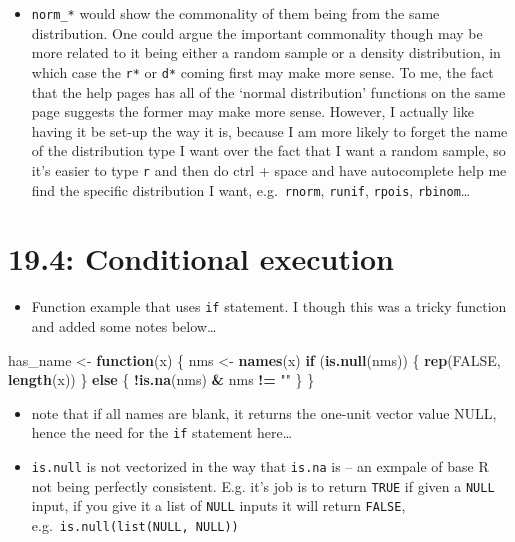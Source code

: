 \documentclass[]{book}
\newenvironment{Shaded}{\begin{snugshade}}{\end{snugshade}}
\newcommand{\ControlFlowTok}[1]{\textcolor[rgb]{0.13,0.29,0.53}{\textbf{#1}}}
\newcommand{\KeywordTok}[1]{\textcolor[rgb]{0.13,0.29,0.53}{\textbf{#1}}}
\newcommand{\NormalTok}[1]{#1}
\newcommand{\OperatorTok}[1]{\textcolor[rgb]{0.81,0.36,0.00}{\textbf{#1}}}
\newcommand{\OtherTok}[1]{\textcolor[rgb]{0.56,0.35,0.01}{#1}}
\newcommand{\StringTok}[1]{\textcolor[rgb]{0.31,0.60,0.02}{#1}}
\providecommand{\tightlist}{%
  \setlength{\itemsep}{0pt}\setlength{\parskip}{0pt}}
\theoremstyle{definition}
\theoremstyle{definition}
\theoremstyle{definition}
\theoremstyle{remark}
\begin{document}
\begin{enumerate}
  \begin{itemize}
  \tightlist
  \item
    \texttt{norm\_*} would show the commonality of them being from the
    same distribution. One could argue the important commonality though
    may be more related to it being either a random sample or a density
    distribution, in which case the \texttt{r*} or \texttt{d*} coming
    first may make more sense. To me, the fact that the help pages has
    all of the `normal distribution' functions on the same page suggests
    the former may make more sense. However, I actually like having it
    be set-up the way it is, because I am more likely to forget the name
    of the distribution type I want over the fact that I want a random
    sample, so it's easier to type \texttt{r} and then do ctrl + space
    and have autocomplete help me find the specific distribution I want,
    e.g.~\texttt{rnorm}, \texttt{runif}, \texttt{rpois},
    \texttt{rbinom}\ldots{}
  \end{itemize}
\end{enumerate}

\hypertarget{conditional-execution}{%
\section{19.4: Conditional execution}\label{conditional-execution}}

\begin{itemize}
\tightlist
\item
  Function example that uses \texttt{if} statement. I though this was a
  tricky function and added some notes below\ldots{}
\end{itemize}

\begin{Shaded}
\begin{Highlighting}[]
\NormalTok{has_name <-}\StringTok{ }\ControlFlowTok{function}\NormalTok{(x) \{}
\NormalTok{  nms <-}\StringTok{ }\KeywordTok{names}\NormalTok{(x) }
  \ControlFlowTok{if}\NormalTok{ (}\KeywordTok{is.null}\NormalTok{(nms)) \{ }
    \KeywordTok{rep}\NormalTok{(}\OtherTok{FALSE}\NormalTok{, }\KeywordTok{length}\NormalTok{(x))}
\NormalTok{  \} }\ControlFlowTok{else}\NormalTok{ \{}
    \OperatorTok{!}\KeywordTok{is.na}\NormalTok{(nms) }\OperatorTok{&}\StringTok{ }\NormalTok{nms }\OperatorTok{!=}\StringTok{ ""}
\NormalTok{  \}}
\NormalTok{\}}
\end{Highlighting}
\end{Shaded}

\begin{itemize}
\tightlist
\item
  note that if all names are blank, it returns the one-unit vector value
  NULL, hence the need for the \texttt{if} statement here\ldots{}
\item
  \texttt{is.null} is not vectorized in the way that \texttt{is.na} is
  -- an exmpale of base R not being perfectly consistent. E.g. it's job
  is to return \texttt{TRUE} if given a \texttt{NULL} input, if you give
  it a list of \texttt{NULL} inputs it will return \texttt{FALSE},
  e.g.~\texttt{is.null(list(NULL,\ NULL))}
\end{itemize}
\end{document}
